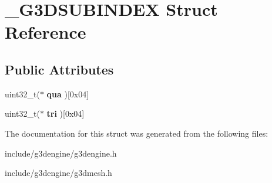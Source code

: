 \hypertarget{struct__G3DSUBINDEX}{}\section{\+\_\+\+G3\+D\+S\+U\+B\+I\+N\+D\+EX Struct Reference}
\label{struct__G3DSUBINDEX}
\subsection*{Public Attributes}
\begin{DoxyCompactItemize}
\item 
\mbox{\label{struct__G3DSUBINDEX_acc7171a623bd0716c009af1d0db406be}} 
uint32\+\_\+t($\ast$ {\bfseries qua} )\mbox{[}0x04\mbox{]}
\item 
\mbox{\label{struct__G3DSUBINDEX_ab6982e4666359a4d9765233abc045728}} 
uint32\+\_\+t($\ast$ {\bfseries tri} )\mbox{[}0x04\mbox{]}
\end{DoxyCompactItemize}


The documentation for this struct was generated from the following files\+:\begin{DoxyCompactItemize}
\item 
include/g3dengine/g3dengine.\+h\item 
include/g3dengine/g3dmesh.\+h\end{DoxyCompactItemize}
